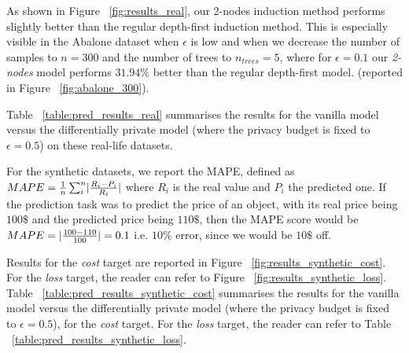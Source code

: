 As shown in Figure ~\ref{fig:results_real}, our 2-nodes induction method performs slightly better than the regular depth-first induction method. This is especially visible in the Abalone dataset when $\epsilon$ is low and when we decrease the number of samples to $n = 300$ and the number of trees to $n_{trees} = 5$, where for $\epsilon=0.1$ our \textit{2-nodes} model performs $31.94\%$ better than the regular depth-first model. (reported in Figure ~\ref{fig:abalone_300}).

Table ~\ref{table:pred_results_real} summarises the results for the vanilla model versus the differentially private model (where the privacy budget is fixed to $\epsilon = 0.5$) on these real-life datasets.

\begin{center}\begin{table}[h!]
	\center
	\noindent{}
\end{table}\end{center}

\newpage

For the synthetic datasets, we report the MAPE, defined as $MAPE = \frac{1}{n}\sum_{i}^n \lvert\frac{R_i - P_i}{R_i}\rvert$ where $R_i$ is the real value and $P_i$ the predicted one. If the prediction task was to predict the price of an object, with its real price being $100\$$ and the predicted price being $110\$$, then the MAPE score would be $MAPE = \lvert\frac{100-110}{100}\rvert = 0.1$ i.e. $10\%$ error, since we would be $10\$$ off. 

Results for the \textit{cost} target are reported in Figure ~\ref{fig:results_synthetic_cost}. For the \textit{loss} target, the reader can refer to Figure ~\ref{fig:results_synthetic_loss}. Table ~\ref{table:pred_results_synthetic_cost} summarises the results for the vanilla model versus the differentially private model (where the privacy budget is fixed to $\epsilon = 0.5$), for the \textit{cost} target. For the \textit{loss} target, the reader can refer to Table ~\ref{table:pred_results_synthetic_loss}.

